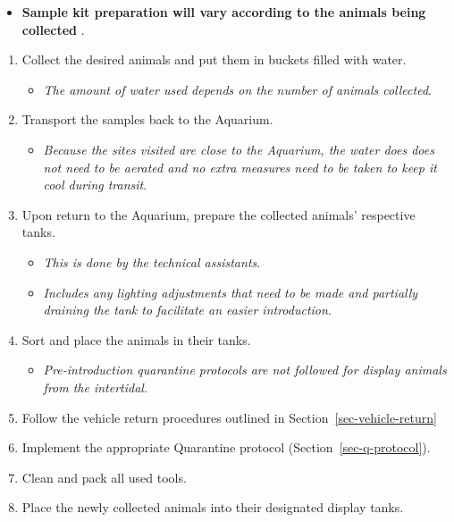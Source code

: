 \documentclass[
  12pt,
]{report}
\providecommand{\tightlist}{%
  \setlength{\itemsep}{0pt}\setlength{\parskip}{0pt}}\usepackage{longtable,booktabs,array}
\begin{document}
\begin{itemize}
\tightlist
\item
  \textbf{Sample kit preparation will vary according to the animals
  being collected} .
\end{itemize}

\begin{enumerate}
\def\labelenumi{\arabic{enumi}.}
\setcounter{enumi}{5}
\tightlist
\item
  Collect the desired animals and put them in buckets filled with water.

  \begin{itemize}
  \tightlist
  \item
    \emph{The amount of water used depends on the number of animals
    collected}.
  \end{itemize}
\item
  Transport the samples back to the Aquarium.

  \begin{itemize}
  \tightlist
  \item
    \emph{Because the sites visited are close to the Aquarium, the water
    does does not need to be aerated and no extra measures need to be
    taken to keep it cool during transit}.
  \end{itemize}
\item
  Upon return to the Aquarium, prepare the collected animals' respective
  tanks.

  \begin{itemize}
  \tightlist
  \item
    \emph{This is done by the technical assistants}.
  \item
    \emph{Includes any lighting adjustments that need to be made and
    partially draining the tank to facilitate an easier introduction}.
  \end{itemize}
\item
  Sort and place the animals in their tanks.

  \begin{itemize}
  \tightlist
  \item
    \emph{Pre-introduction quarantine protocols are not followed for
    display animals from the intertidal}.
  \end{itemize}
\item
  Follow the vehicle return procedures outlined in
  Section~\ref{sec-vehicle-return}
\item
  Implement the appropriate Quarantine protocol
  (Section~\ref{sec-q-protocol}).
\item
  Clean and pack all used tools.
\item
  Place the newly collected animals into their designated display tanks.
\end{enumerate}
\end{document}
